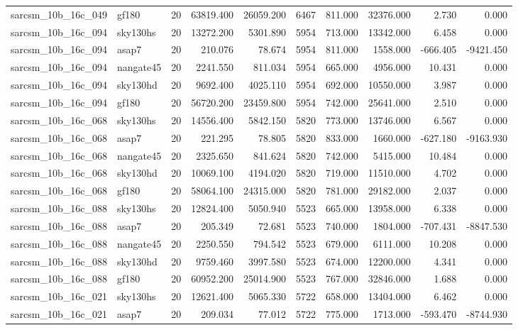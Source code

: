 \begin{tabular}{llrrrrrrrr}
sarcsm\_10b\_16c\_049 & gf180 & 20 & 63819.400 & 26059.200 & 6467 & 811.000 & 32376.000 & 2.730 & 0.000 \\
sarcsm\_10b\_16c\_094 & sky130hs & 20 & 13272.200 & 5301.890 & 5954 & 713.000 & 13342.000 & 6.458 & 0.000 \\
sarcsm\_10b\_16c\_094 & asap7 & 20 & 210.076 & 78.674 & 5954 & 811.000 & 1558.000 & -666.405 & -9421.450 \\
sarcsm\_10b\_16c\_094 & nangate45 & 20 & 2241.550 & 811.034 & 5954 & 665.000 & 4956.000 & 10.431 & 0.000 \\
sarcsm\_10b\_16c\_094 & sky130hd & 20 & 9692.400 & 4025.110 & 5954 & 692.000 & 10550.000 & 3.987 & 0.000 \\
sarcsm\_10b\_16c\_094 & gf180 & 20 & 56720.200 & 23459.800 & 5954 & 742.000 & 25641.000 & 2.510 & 0.000 \\
sarcsm\_10b\_16c\_068 & sky130hs & 20 & 14556.400 & 5842.150 & 5820 & 773.000 & 13746.000 & 6.567 & 0.000 \\
sarcsm\_10b\_16c\_068 & asap7 & 20 & 221.295 & 78.805 & 5820 & 833.000 & 1660.000 & -627.180 & -9163.930 \\
sarcsm\_10b\_16c\_068 & nangate45 & 20 & 2325.650 & 841.624 & 5820 & 742.000 & 5415.000 & 10.484 & 0.000 \\
sarcsm\_10b\_16c\_068 & sky130hd & 20 & 10069.100 & 4194.020 & 5820 & 719.000 & 11510.000 & 4.702 & 0.000 \\
sarcsm\_10b\_16c\_068 & gf180 & 20 & 58064.100 & 24315.000 & 5820 & 781.000 & 29182.000 & 2.037 & 0.000 \\
sarcsm\_10b\_16c\_088 & sky130hs & 20 & 12824.400 & 5050.940 & 5523 & 665.000 & 13958.000 & 6.338 & 0.000 \\
sarcsm\_10b\_16c\_088 & asap7 & 20 & 205.349 & 72.681 & 5523 & 740.000 & 1804.000 & -707.431 & -8847.530 \\
sarcsm\_10b\_16c\_088 & nangate45 & 20 & 2250.550 & 794.542 & 5523 & 679.000 & 6111.000 & 10.208 & 0.000 \\
sarcsm\_10b\_16c\_088 & sky130hd & 20 & 9759.460 & 3997.580 & 5523 & 674.000 & 12200.000 & 4.341 & 0.000 \\
sarcsm\_10b\_16c\_088 & gf180 & 20 & 60952.200 & 25014.900 & 5523 & 767.000 & 32846.000 & 1.688 & 0.000 \\
sarcsm\_10b\_16c\_021 & sky130hs & 20 & 12621.400 & 5065.330 & 5722 & 658.000 & 13404.000 & 6.462 & 0.000 \\
sarcsm\_10b\_16c\_021 & asap7 & 20 & 209.034 & 77.012 & 5722 & 775.000 & 1713.000 & -593.470 & -8744.930 \\

\end{tabular}

